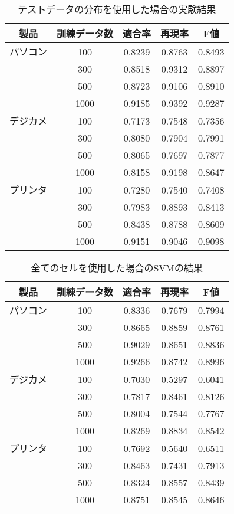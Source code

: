 \begin{table}[!tb]
\caption{テストデータの分布を使用した場合の実験結果}
\label{right-dis}
\begin{center}
\begin{tabular}{|c|c|c|c|c|}\hline
製品 & 訓練データ数 & 適合率 & 再現率 & F値 \\ \hline\hline
パソコン & 100 & 0.8239 & 0.8763 & 0.8493 \\ \cline{2-5}
 & 300 & 0.8518 & 0.9312 & 0.8897 \\ \cline{2-5}
 & 500 & 0.8723 & 0.9106 & 0.8910 \\ \cline{2-5}
 & 1000 & 0.9185 & 0.9392 & 0.9287 \\ \hline\hline
デジカメ & 100 & 0.7173 & 0.7548 & 0.7356 \\ \cline{2-5}
 & 300 & 0.8080 & 0.7904  & 0.7991 \\ \cline{2-5}
 & 500 & 0.8065 & 0.7697 & 0.7877 \\ \cline{2-5}
& 1000 & 0.8158 & 0.9198 & 0.8647 \\ \hline\hline
プリンタ & 100 & 0.7280 & 0.7540 & 0.7408 \\ \cline{2-5}
 & 300 & 0.7983 & 0.8893 & 0.8413 \\ \cline{2-5}
 & 500 & 0.8438 & 0.8788 & 0.8609 \\ \cline{2-5}
 & 1000 & 0.9151 & 0.9046 & 0.9098 \\ \hline
\end{tabular}
\end{center}
\end{table}

\begin{table}[!tb]
\caption{全てのセルを使用した場合のSVMの結果}
\label{all_fea}
\begin{center}
\begin{tabular}{|c|c|c|c|c|}\hline
製品 & 訓練データ数 & 適合率 & 再現率 & F値 \\ \hline\hline
パソコン & 100 & 0.8336 & 0.7679 & 0.7994 \\ \cline{2-5}
 & 300 & 0.8665 & 0.8859 & 0.8761 \\ \cline{2-5}
 & 500 & 0.9029 & 0.8651 & 0.8836 \\ \cline{2-5}
 & 1000 & 0.9266 & 0.8742 & 0.8996 \\ \hline\hline
デジカメ & 100 & 0.7030 & 0.5297 & 0.6041 \\ \cline{2-5}
 & 300 & 0.7817 & 0.8461 & 0.8126 \\ \cline{2-5}
 & 500 & 0.8004 & 0.7544 & 0.7767 \\ \cline{2-5}
 & 1000 & 0.8269 & 0.8834 & 0.8542 \\ \hline\hline
プリンタ & 100 & 0.7692 & 0.5640 & 0.6511 \\ \cline{2-5}
 & 300 & 0.8463 & 0.7431 & 0.7913 \\ \cline{2-5}
 & 500 & 0.8324 & 0.8557 & 0.8439 \\ \cline{2-5}
 & 1000 & 0.8751 & 0.8545 & 0.8646 \\ \hline
\end{tabular}
\end{center}
\end{table}

